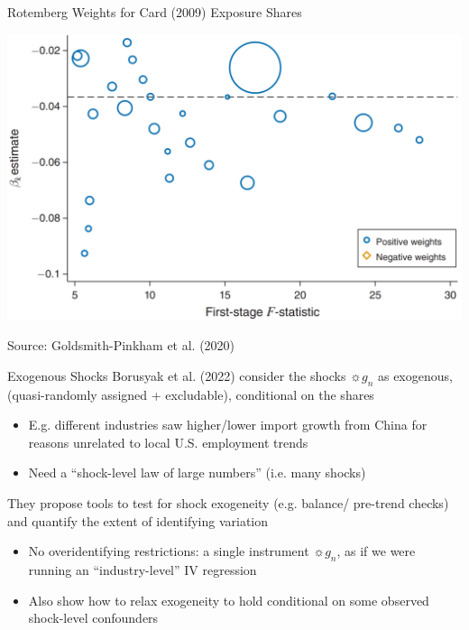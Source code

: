 \documentclass{beamer}
\begin{document}
\begin{frame}{Rotemberg Weights for Card (2009) Exposure Shares}
\begin{center}
\includegraphics[scale=0.28]{./lecture_includes/card_weights.png}
\end{center}
\vspace{-0.3cm}
Source: Goldsmith-Pinkham et al. (2020)
\end{frame}

\begin{frame}{Exogenous Shocks}
Borusyak et al. (2022) consider the shocks $\sun{g_n}$ as exogenous,  (quasi-randomly assigned + excludable), conditional on the shares\smallskip
\begin{itemize}
  \item E.g. different industries saw higher/lower import growth from China for reasons unrelated to local U.S. employment trends\smallskip
  \item Need a ``shock-level law of large numbers'' (i.e. many shocks)
\end{itemize}\bigskip\pause{}

They propose tools to test for shock exogeneity (e.g. balance/ pre-trend checks) and quantify the extent of identifying variation \smallskip
\begin{itemize}
  \item No overidentifying restrictions: a single instrument $\sun{g_n}$, as if we were running an ``industry-level'' IV regression \smallskip
  \item Also show how to relax exogeneity to hold conditional on some observed shock-level confounders
\end{itemize}

\end{frame}
\end{document}
